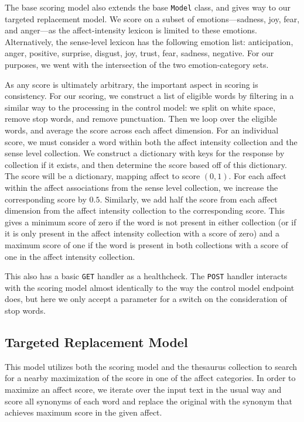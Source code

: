 \documentclass[11pt, twoside, reqno]{book}
\begin{document}
The base scoring model also extends the base \texttt{Model} class, and gives way to our targeted replacement model. We score on a subset of emotions—sadness, joy, fear, and anger—as the affect-intensity lexicon is limited to these emotions. Alternatively, the sense-level lexicon has the following emotion list: anticipation, anger, positive, surprise, disgust, joy, trust, fear, sadness, negative. For our purposes, we went with the intersection of the two emotion-category sets.

As any score is ultimately arbitrary, the important aspect in scoring is consistency. For our scoring, we construct a list of eligible words by filtering in a similar way to the processing in the control model: we split on white space, remove stop words, and remove punctuation. Then we loop over the eligible words, and average the score across each affect dimension. For an individual score, we must consider a word within both the affect intensity collection and the sense level collection. We construct a dictionary with keys for the response by collection if it exists, and then determine the score based off of this dictionary. The score will be a dictionary, mapping affect to score $(0, 1)$. For each affect within the affect associations from the sense level collection, we increase the corresponding score by $0.5$. Similarly, we add half the score from each affect dimension from the affect intensity collection to the corresponding score. This gives a minimum score of zero if the word is not present in either collection (or if it is only present in the affect intensity collection with a score of zero) and a maximum score of one if the word is present in both collections with a score of one in the affect intensity collection.

This also has a basic \texttt{GET} handler as a healthcheck. The \texttt{POST} handler interacts with the scoring model almost identically to the way the control model endpoint does, but here we only accept a parameter for a switch on the consideration of stop words.

\subsection{Targeted Replacement Model}

This model utilizes both the scoring model and the thesaurus collection to search for a nearby maximization of the score in one of the affect categories. In order to maximize an affect score, we iterate over the input text in the usual way and  score all synonyms of each word and replace the original with the synonym that achieves maximum score in the given affect.
\end{document}
